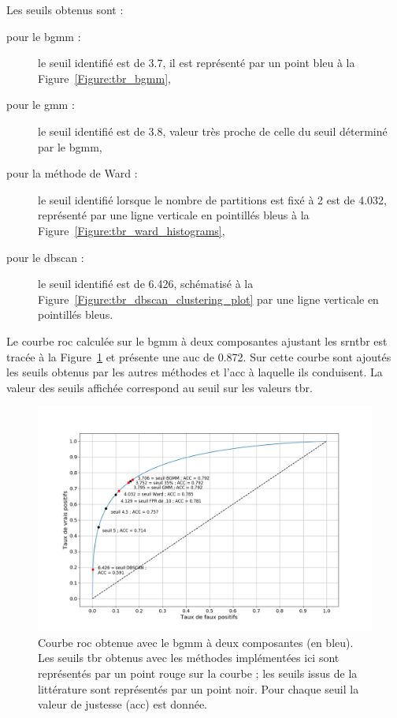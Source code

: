 Les seuils obtenus sont : 
\begin{description}
\item[pour le \gls{bgmm} : ] le seuil identifié est de 3.7, il est représenté par un point bleu à la Figure~\ref{Figure:tbr_bgmm},
\item[pour le \gls{gmm} : ] le seuil identifié est de 3.8, valeur très proche de celle du seuil déterminé par le \gls{bgmm},
\item[pour la méthode de Ward : ] le seuil identifié lorsque le nombre de partitions est fixé à 2 est de 4.032, représenté
par une ligne verticale en pointillés bleus à la Figure~\ref{Figure:tbr_ward_histograms},
\item[pour le \gls{dbscan} : ] le seuil identifié est de 6.426, schématisé à la Figure~\ref{Figure:tbr_dbscan_clustering_plot} par une ligne
verticale en pointillés bleus. 
\end{description}

Le courbe \gls{roc} calculée sur le \gls{bgmm} à deux composantes ajustant les \gls{srntbr} est tracée à la Figure~\ref{Figure:tbr_roc} et 
présente une \gls{auc} de 0.872. Sur cette courbe sont ajoutés les seuils obtenus par les autres méthodes et l'\gls{acc} à laquelle ils conduisent. 
La valeur des seuils affichée correspond au seuil sur les valeurs \gls{tbr}. 

\begin{figure}[h!]
  \centering
	\includegraphics[width=1.0\linewidth]{figures/chapter-4/tbr-roc} 
  \caption[Courbe \gls{roc} obtenue avec le \gls{bgmm} à deux composantes.]{Courbe \gls{roc} obtenue avec le \gls{bgmm} à deux composantes (en bleu). Les seuils \gls{tbr} obtenus avec les méthodes implémentées ici sont représentés 
	par un point rouge sur la courbe ; les seuils issus de la littérature sont représentés par un point noir. Pour chaque seuil la valeur de justesse (\gls{acc}) 
	est donnée.}
  \label{Figure:tbr_roc}
\end{figure}

